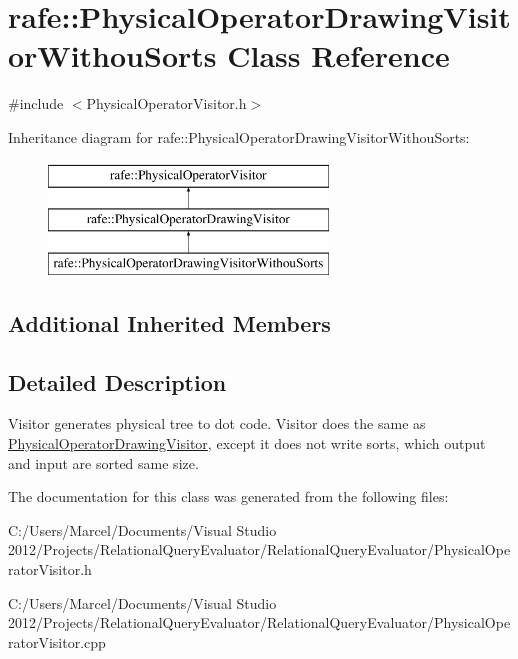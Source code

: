 \hypertarget{classrafe_1_1_physical_operator_drawing_visitor_withou_sorts}{\section{rafe\+:\+:Physical\+Operator\+Drawing\+Visitor\+Withou\+Sorts Class Reference}
\label{classrafe_1_1_physical_operator_drawing_visitor_withou_sorts}
}


{\ttfamily \#include $<$Physical\+Operator\+Visitor.\+h$>$}

Inheritance diagram for rafe\+:\+:Physical\+Operator\+Drawing\+Visitor\+Withou\+Sorts\+:\begin{figure}[H]
\begin{center}
\leavevmode
\includegraphics[height=3.000000cm]{classrafe_1_1_physical_operator_drawing_visitor_withou_sorts}
\end{center}
\end{figure}
\subsection*{Additional Inherited Members}


\subsection{Detailed Description}
Visitor generates physical tree to dot code. Visitor does the same as \hyperlink{classrafe_1_1_physical_operator_drawing_visitor}{Physical\+Operator\+Drawing\+Visitor}, except it does not write sorts, which output and input are sorted same size. 

The documentation for this class was generated from the following files\+:\begin{DoxyCompactItemize}
\item 
C\+:/\+Users/\+Marcel/\+Documents/\+Visual Studio 2012/\+Projects/\+Relational\+Query\+Evaluator/\+Relational\+Query\+Evaluator/Physical\+Operator\+Visitor.\+h\item 
C\+:/\+Users/\+Marcel/\+Documents/\+Visual Studio 2012/\+Projects/\+Relational\+Query\+Evaluator/\+Relational\+Query\+Evaluator/Physical\+Operator\+Visitor.\+cpp\end{DoxyCompactItemize}
